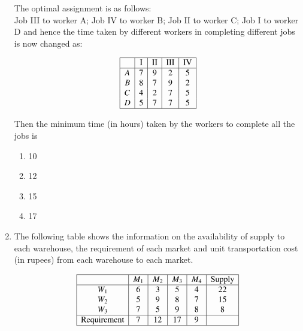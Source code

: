 \documentclass[journal]{IEEEtran}
\numberwithin{equation}{enumi}
\numberwithin{figure}{enumi}
\begin{document}
\begin{enumerate}
The optimal assignment is as follows: \\
Job III to worker A; Job IV to worker B; Job II to worker C; Job I to worker D and hence the time taken by different workers in completing different jobs is now changed as:

\begin{align*}
\begin{array}{|c|c|c|c|c|}
 \hline
    & \text{I} & \text{II} & \text{III} & \text{IV} \\
    \hline
    A & 7 & 9 & 2 & 5 \\
    B & 8 & 7 & 9 & 2 \\
    C & 4 & 2 & 7 & 5 \\
    D & 5 & 7 & 7 & 5 \\
     \hline
\end{array}
\end{align*}

Then the minimum time (in hours) taken by the workers to complete all the jobs is
\hfill{}
\begin{multicols}{4}
\begin{enumerate}
\item  10 
\item  12 
\item  15 
\item  17
\end{enumerate}
\end{multicols}



\item The following table shows the information on the availability of supply to each warehouse, the requirement of each market and unit transportation cost (in rupees) from each warehouse to each market. 

\begin{align*}
\begin{array}{|c|c|c|c|c|c|}
   \hline
    & M_1 & M_2 & M_3 & M_4 & \text{Supply} \\
    \hline
    W_1 & 6 & 3 & 5 & 4 & 22 \\
    W_2 & 5 & 9 & 8 & 7 & 15 \\
    W_3 & 7 & 5 & 9 & 8 & 8 \\
    \hline
    \text{Requirement} & 7 & 12 & 17 & 9 & \\
    \hline
\end{array}
\end{align*}


\end{enumerate}
\end{document}
